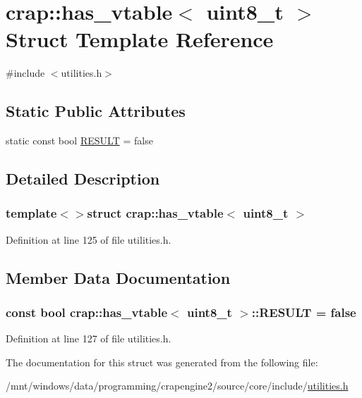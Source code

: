 \hypertarget{structcrap_1_1has__vtable_3_01uint8__t_01_4}{}\section{crap\+:\+:has\+\_\+vtable$<$ uint8\+\_\+t $>$ Struct Template Reference}
\label{structcrap_1_1has__vtable_3_01uint8__t_01_4}


{\ttfamily \#include $<$utilities.\+h$>$}

\subsection*{Static Public Attributes}
\begin{DoxyCompactItemize}
\item 
static const bool \hyperlink{structcrap_1_1has__vtable_3_01uint8__t_01_4_a00be5e8eb221f0c0d96fe812303b0b70}{R\+E\+S\+U\+L\+T} = false
\end{DoxyCompactItemize}


\subsection{Detailed Description}
\subsubsection*{template$<$$>$struct crap\+::has\+\_\+vtable$<$ uint8\+\_\+t $>$}



Definition at line 125 of file utilities.\+h.



\subsection{Member Data Documentation}
\hypertarget{structcrap_1_1has__vtable_3_01uint8__t_01_4_a00be5e8eb221f0c0d96fe812303b0b70}{}
\subsubsection[{R\+E\+S\+U\+L\+T}]{\setlength{\rightskip}{0pt plus 5cm}const bool {\bf crap\+::has\+\_\+vtable}$<$ uint8\+\_\+t $>$\+::R\+E\+S\+U\+L\+T = false\hspace{0.3cm}{\ttfamily [static]}}\label{structcrap_1_1has__vtable_3_01uint8__t_01_4_a00be5e8eb221f0c0d96fe812303b0b70}


Definition at line 127 of file utilities.\+h.



The documentation for this struct was generated from the following file\+:\begin{DoxyCompactItemize}
\item 
/mnt/windows/data/programming/crapengine2/source/core/include/\hyperlink{utilities_8h}{utilities.\+h}\end{DoxyCompactItemize}
